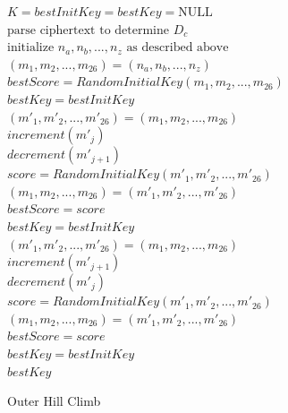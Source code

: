 \documentclass[Lau,binding=0.6cm,oneside]{sapthesis}
\begin{document}
\begin{algorithm}
	$K = bestInitKey = bestKey = \text{NULL}$\\
	$\text{parse ciphertext to determine } D_c$\\
	$\text{initialize } n_a, n_b, ..., n_z \text{ as described above}$\\
	$(m_1, m_2, ..., m_{26}) = (n_a, n_b, ..., n_z)$\\
	$bestScore = RandomInitialKey(m_1, m_2, ..., m_{26})$\\
	$bestKey = bestInitKey$\\
	{
		{
			$(m'_1, m'_2, ..., m'_{26}) = (m_1, m_2, ..., m_{26})$\\
			$increment(m'_j)$\\
			$decrement(m'_{j+1})$\\
			$score = RandomInitialKey(m'_1, m'_2, ..., m'_{26})$\\
			{
				$(m_1, m_2, ..., m_{26}) = (m'_1, m'_2, ..., m'_{26})$\\
				$bestScore = score$\\
				$bestKey = bestInitKey$\\
			}
			\Else
			{
				$(m'_1, m'_2, ..., m'_{26}) = (m_1, m_2, ..., m_{26})$\\
				$increment(m'_{j+1})$\\
				$decrement(m'_j)$\\
				$score = RandomInitialKey(m'_1, m'_2, ..., m'_{26})$\\
				{
					$(m_1, m_2, ..., m_{26}) = (m'_1, m'_2, ..., m'_{26})$\\
					$bestScore = score$\\
					$bestKey = bestInitKey$\\
				}
			}
		}	
	}
	\Return $bestKey$
	\caption{Outer Hill Climb}
\end{algorithm}

\end{document}
